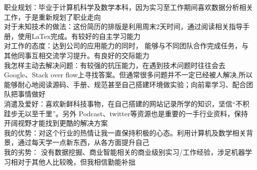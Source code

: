
\begin{cvparagraph}
\bullet 职业规划：毕业于计算机科学及数学本科，因为实习至工作期间喜欢数据分析相关工作，于是重新规划了职业走向\\
\bullet  对于未知技术的做法：这份简历的排版是利用周末2天时间，通过阅读相关指导手册，使用LaTex完成。有较好的自主学习能力\\
\bullet  对工作的态度：达到公司的应用能力的同时， 能够与不同团队合作完成任务，与其他同事互相交流学习提升。有良好的交际能力\\
\bullet  我怎样主动去解决问题：有较强的抗压能力，在遇到技术问题时往往会去Google、Stack over flow上寻找答案。但通常很多问题并不一定已经被人解决,所以能够耐心地阅读源码、手册、规范甚至自己搭建环境做实验；向前辈学习、配合团队把事情做好\\
\bullet  消遣及爱好：喜欢新鲜科技事物，在自己搭建的网站{\href{http://chenmu1.com/}{\color{deepblue}{Ethan Mu}}记录所学的知识，坚信“不积跬步无以至千里”}。另外 Podcast、twitter等资源也是重要的一手行业资料，保持开阔视野才能找到更酷的解决方案\\
\bullet  我的优势：对这个行业的热情让我一直保持积极的心态。利用计算机及数学相关背景，通过每天学一点新东西，从各方面提升自己\\
\bullet  我的劣势： 没有数据挖掘、商业智能相关的商业级别实习/工作经验，涉足机器学习相对于其他人比较晚，但我相信勤能补拙
\end{cvparagraph}


